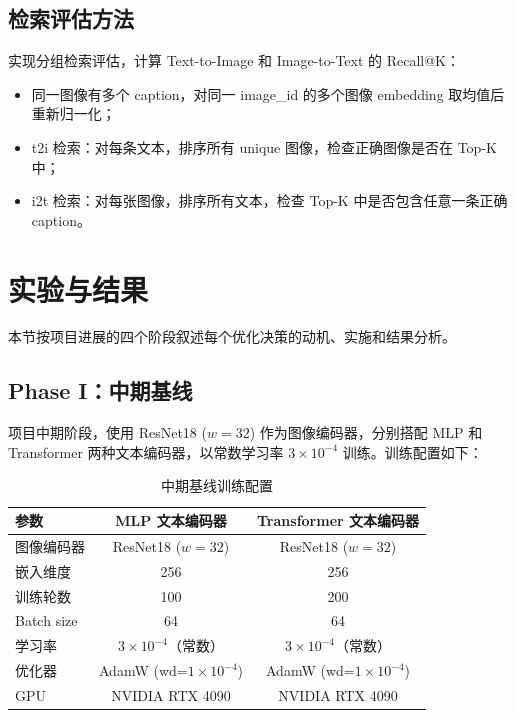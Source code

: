 \documentclass[12pt,a4paper]{article}
\begin{document}
\subsection{检索评估方法}

实现分组检索评估，计算 Text-to-Image 和 Image-to-Text 的 Recall@K：

\begin{itemize}[nosep]
    \item 同一图像有多个 caption，对同一 image\_id 的多个图像 embedding 取均值后重新归一化；
    \item t2i 检索：对每条文本，排序所有 unique 图像，检查正确图像是否在 Top-K 中；
    \item i2t 检索：对每张图像，排序所有文本，检查 Top-K 中是否包含任意一条正确 caption。
\end{itemize}

\section{实验与结果}

本节按项目进展的四个阶段叙述每个优化决策的动机、实施和结果分析。

\subsection{Phase I：中期基线}

项目中期阶段，使用 ResNet18 ($w=32$) 作为图像编码器，分别搭配 MLP 和 Transformer 两种文本编码器，以常数学习率 $3\times 10^{-4}$ 训练。训练配置如下：

\begin{table}[H]
\centering
\caption{中期基线训练配置}
\begin{tabular}{lcc}
\toprule
\textbf{参数} & \textbf{MLP 文本编码器} & \textbf{Transformer 文本编码器} \\
\midrule
图像编码器 & ResNet18 ($w=32$) & ResNet18 ($w=32$) \\
嵌入维度 & 256 & 256 \\
训练轮数 & 100 & 200 \\
Batch size & 64 & 64 \\
学习率 & $3\times 10^{-4}$（常数） & $3\times 10^{-4}$（常数） \\
优化器 & AdamW (wd=$1\times 10^{-4}$) & AdamW (wd=$1\times 10^{-4}$) \\
GPU & NVIDIA RTX 4090 & NVIDIA RTX 4090 \\
\bottomrule
\end{tabular}
\end{table}
\end{document}
